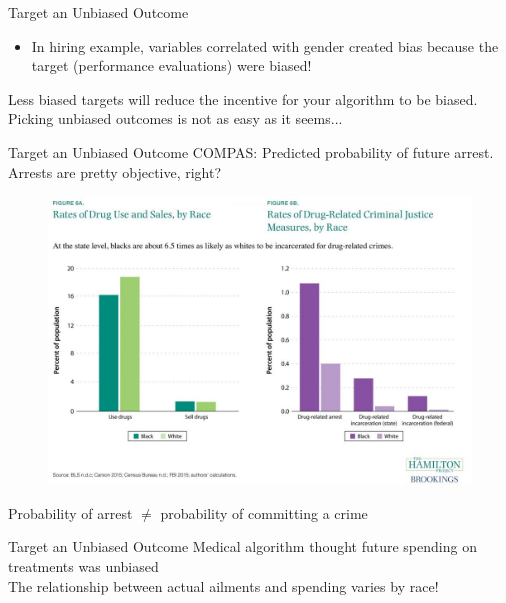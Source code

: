 \documentclass[11pt]{beamer}
\begin{document}
\begin{frame}[c]{Target an Unbiased Outcome}
\begin{itemize}
  \pause \item In hiring example, variables correlated with gender created bias because the target (performance evaluations) were biased!
\end{itemize}
\pause Less biased targets will reduce the incentive for your algorithm to be biased. \\
\pause Picking unbiased outcomes is not as easy as it seems...
\end{frame}

\begin{frame}[c]{Target an Unbiased Outcome}
  COMPAS: Predicted probability of future arrest. \\
  \pause Arrests are pretty objective, right?
\end{frame}

\begin{frame}[c]{}
  \begin{figure}
    \centering
    \includegraphics[width=\textwidth]{images/drug_use_versus_arrest.jpg}
  \end{figure}
  Probability of arrest $\neq$ probability of committing a crime
\end{frame}

\begin{frame}[c]{Target an Unbiased Outcome}
    Medical algorithm \alert{thought} future spending on treatments was unbiased \\
    \vspace{0.2cm}
    \pause The relationship between actual ailments and spending varies by race!
\end{frame}
\end{document}
